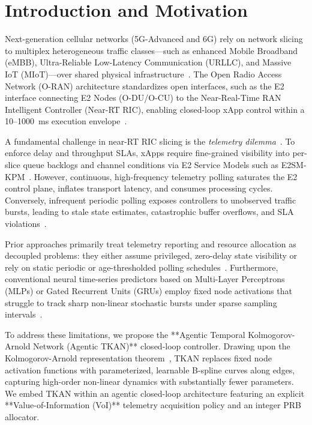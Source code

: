 \documentclass[conference]{IEEEtran}
\begin{document}
\section{Introduction and Motivation}
Next-generation cellular networks (5G-Advanced and 6G) rely on network slicing to multiplex heterogeneous traffic classes—such as enhanced Mobile Broadband (eMBB), Ultra-Reliable Low-Latency Communication (URLLC), and Massive IoT (MIoT)—over shared physical infrastructure~\cite{foukas2017orion, polese2023understanding}. The Open Radio Access Network (O-RAN) architecture standardizes open interfaces, such as the E2 interface connecting E2 Nodes (O-DU/O-CU) to the Near-Real-Time RAN Intelligent Controller (Near-RT RIC), enabling closed-loop xApp control within a 10--1000~ms execution envelope~\cite{bonati2021intelligence}.

A fundamental challenge in near-RT RIC slicing is the \textit{telemetry dilemma}~\cite{doro2022dinos}. To enforce delay and throughput SLAs, xApps require fine-grained visibility into per-slice queue backlogs and channel conditions via E2 Service Models such as E2SM-KPM~\cite{oranspec2022kpm}. However, continuous, high-frequency telemetry polling saturates the E2 control plane, inflates transport latency, and consumes processing cycles. Conversely, infrequent periodic polling exposes controllers to unobserved traffic bursts, leading to stale state estimates, catastrophic buffer overflows, and SLA violations~\cite{sun2019age, kosta2017age}.

Prior approaches primarily treat telemetry reporting and resource allocation as decoupled problems: they either assume privileged, zero-delay state visibility or rely on static periodic or age-thresholded polling schedules~\cite{bega2019deepcog}. Furthermore, conventional neural time-series predictors based on Multi-Layer Perceptrons (MLPs) or Gated Recurrent Units (GRUs) employ fixed node activations that struggle to track sharp non-linear stochastic bursts under sparse sampling intervals~\cite{cho2014gru}.

To address these limitations, we propose the **Agentic Temporal Kolmogorov-Arnold Network (Agentic TKAN)** closed-loop controller. Drawing upon the Kolmogorov-Arnold representation theorem~\cite{liu2024kan, genet2024tkan}, TKAN replaces fixed node activation functions with parameterized, learnable B-spline curves along edges, capturing high-order non-linear dynamics with substantially fewer parameters. We embed TKAN within an agentic closed-loop architecture featuring an explicit **Value-of-Information (VoI)** telemetry acquisition policy and an integer PRB allocator.
\end{document}
